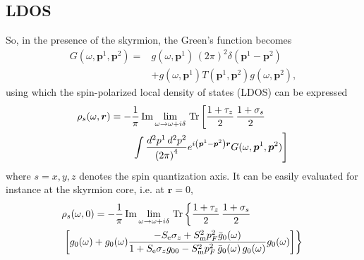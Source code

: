 \documentclass[twocolumn,showpacs,floatfix,nofootinbib,longbibliography]{revtex4-1}
\begin{document}
\subsection{LDOS} \label{sec:LDOS}
So, in the presence of the skyrmion, the Green's function becomes
\begin{align}
	G(\omega,\bm p^1,\bm p^2) =& g(\omega,\bm p^1)\,(2\pi)^2\delta(\bm p^1-\bm p^2) \nonumber \\ 
	          &  +g(\omega,\bm p^1) T(\bm p^1,\bm p^2) g(\omega,\bm p^2),
	\label{G}
\end{align}
using which the spin-polarized local density of states (LDOS) can be expressed
\begin{align}
	\rho_s(\omega,\bm r) = -&\frac{1}{\pi}\,{\rm Im}\lim_{\omega\rightarrow \omega+i\delta}{\rm\,Tr} \left[ \frac{1+\tau_z}{2}\,\frac{1+\sigma_s}{2} \right. \label{rhor} \\
	&\left.\int \frac{d^2p^1\,d^2p^2}{\left( 2\pi \right)^4} e^{i\left( \bm p^1-\bm p^2 \right)\bm r} G(\omega,\bm p^1,\bm p^2)\right]\, \nonumber 
\end{align}
where $s=x,y,z$ denotes the spin quantization axis. It can be easily evaluated for instance at the skyrmion core, i.e. at $\bm r=0$,
\begin{align}
	& \rho_s(\omega,0) = -\frac{1}{\pi}\,{\rm Im}\lim_{\omega\rightarrow \omega+i\delta}{\rm \,Tr} \left\{  \frac{1+\tau_z}{2}\,\frac{1+\sigma_s}{2}  \right. \label{spldos} \\
	&\left.\left[g_0(\omega)+g_0(\omega)  \frac{-S_{\rm e}\sigma_z+S^2_{\rm m}p_F^2\bar g_{0}(\omega)}{1+S_{\rm e}\sigma_zg_{00}-S^2_{\rm m}p_F^2\,\bar g_{0}(\omega)\, g_{0}(\omega)} g_0(\omega)  \right]\right\}\, \nonumber 
\end{align}
\end{document}
